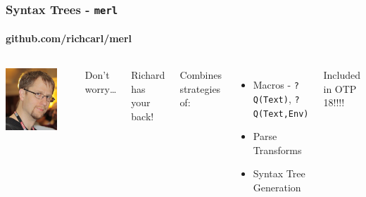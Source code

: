 \documentclass[c]{beamer}
\begin{document}
\begin{frame}
  \frametitle{Syntax Trees - \texttt{merl}}
  \framesubtitle{github.com/richcarl/merl}
  \begin{columns}[c]
      \includegraphics[width=0.8\textwidth]{richcarl.jpg}
      \par Don't worry\ldots
      \par {\Large Richard has your back!}
      
      \pause
      \par Combines strategies of:
      \begin{itemize}
      \item Macros - \texttt{?Q(Text)}, \texttt{?Q(Text,Env)}
      \item Parse Transforms
      \item Syntax Tree Generation
      \end{itemize}
      \pause
      \begin{center}
        {\Large\color{solarizedGreen} Included in OTP 18!!!!}
      \end{center}
  
  \end{columns}
\end{frame}
\end{document}

